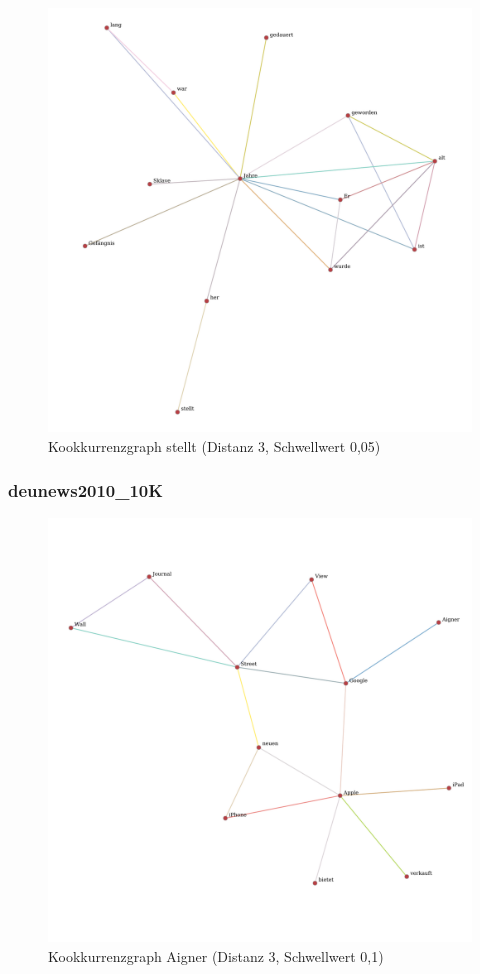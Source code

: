\documentclass[11pt, a4paper]{article}
\begin{document}
\begin{figure}[hp!]
    \centering
        \includegraphics[scale=.4]{../../data/results/longpath_wordgraphs/nl/graph_stellt.pdf}
    \caption{Kookkurrenzgraph stellt (Distanz 3, Schwellwert 0,05)}
\end{figure}

\pagebreak

\subsubsection{deunews2010\_10K}

\begin{figure}[hp!]
    \centering
        \includegraphics[scale=.4]{../../data/results/longpath_wordgraphs/den/graph_Aigner.pdf}
    \caption{Kookkurrenzgraph Aigner (Distanz 3, Schwellwert 0,1)}
\end{figure}
\end{document}

